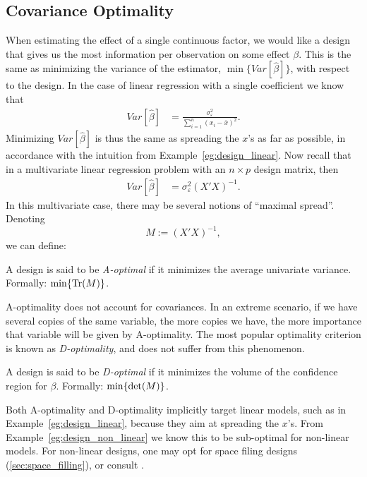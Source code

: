 \subsection{Covariance Optimality}
When estimating the effect of a single continuous factor, we would like a design that gives us the most information per observation on some effect $\beta$. 
This is the same as minimizing the variance of the estimator, $\min \{Var[\hat{\beta}]\}$, with respect to the design.
In the case of linear regression with a single coefficient we know that 
\begin{align}
Var[\hat{\beta}] &= \frac{\sigma^2_\varepsilon}{\sum_{i=1}^{n}(x_i-\bar{x})^2}.
\end{align}
Minimizing $Var[\hat{\beta}]$ is thus the same as spreading the $x$'s as far as possible, in accordance with the intuition from Example~\ref{eg:design_linear}.
Now recall that in a multivariate linear regression problem with an $n \times p$ design matrix, then 
\begin{align}
Var[\hat{\beta}] &= \sigma^2_\varepsilon (X'X)^{-1}.
\end{align}
In this multivariate case, there may be several notions of ``maximal spread''. 
Denoting $$M:= (X'X)^{-1},$$ we can define:
\begin{definition}[A-Optimality]
	A design is said to be \emph{A-optimal} if it minimizes the average univariate variance.
	Formally: $\min \{ \operatorname{Tr}(M) \}$.
\end{definition}
A-optimality does not account for covariances. 
In an extreme scenario, if we have several copies of the same variable, the more copies we have, the more importance that variable will be given by A-optimality.
The most popular optimality criterion is known as \emph{D-optimality}, and does not suffer from this phenomenon.
\begin{definition}[D-Optimality]
	A design is said to be \emph{D-optimal} if it minimizes the volume of the confidence region for $\beta$. 
	Formally: $\min \{ \det(M) \}$.
\end{definition}

Both A-optimality and D-optimality implicitly target linear models, such as in Example~\ref{eg:design_linear}, because they aim at spreading the $x$'s. From Example~\ref{eg:design_non_linear} we know this to be sub-optimal for non-linear models. 
For non-linear designs, one may opt for space filing designs (\ref{sec:space_filling}), or consult \cite{pukelsheim_optimal_1993}. 



